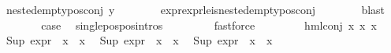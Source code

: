 \begin{isabellebody}
\ {\isachardoublequoteopen}nested{\isacharunderscore}{\kern0pt}empty{\isacharunderscore}{\kern0pt}pos{\isacharunderscore}{\kern0pt}conj\ y{\isachardoublequoteclose}\isanewline
\ \ \ \ \ \ \isamarkupfalse%
\ expr{\isacharunderscore}{\kern0pt}{}{\isacharunderscore}{\kern0pt}expr{\isacharunderscore}{\kern0pt}{}{\isacharunderscore}{\kern0pt}le{\isacharunderscore}{\kern0pt}{}{\isacharunderscore}{\kern0pt}is{\isacharunderscore}{\kern0pt}nested{\isacharunderscore}{\kern0pt}empty{\isacharunderscore}{\kern0pt}pos{\isacharunderscore}{\kern0pt}conj\isanewline
\ \ \ \ \ \ \isamarkupfalse%
\ blast\ \isanewline
\ \ \ \ \isamarkupfalse%
\ \isamarkupfalse%
\ {\isacharquery}{\kern0pt}case\ \isamarkupfalse%
\ single{\isacharunderscore}{\kern0pt}pos{\isacharunderscore}{\kern0pt}pos{\isachardot}{\kern0pt}intros{\isacharparenleft}{\kern0pt}{}{\isacharparenright}{\kern0pt}\ \isanewline
\ \ \ \ \ \ \isamarkupfalse%
\ fastforce\isanewline
\ \ \isamarkupfalse%
\isanewline
\ \ \ \ \isamarkupfalse%
\ {\isacharparenleft}{\kern0pt}hml{\isacharunderscore}{\kern0pt}conj\ x{}\ x{}\ x{}{\isacharparenright}{\kern0pt}\isanewline
{}\isamarkupfalse%
\ {\isachardoublequoteopen}{\isacharparenleft}{\kern0pt}Sup\ {\isacharparenleft}{\kern0pt}{\isacharparenleft}{\kern0pt}expr{\isacharunderscore}{\kern0pt}{}\ {\isasymcirc}\ x{}{\isacharparenright}{\kern0pt}\ {\isacharbackquote}{\kern0pt}\ x{}{\isacharparenright}{\kern0pt}\ {\isasymle}\ {}{\isacharparenright}{\kern0pt}{\isachardoublequoteclose}\isanewline
{\isachardoublequoteopen}{\isacharparenleft}{\kern0pt}Sup\ {\isacharparenleft}{\kern0pt}{\isacharparenleft}{\kern0pt}expr{\isacharunderscore}{\kern0pt}{}\ {\isasymcirc}\ x{}{\isacharparenright}{\kern0pt}\ {\isacharbackquote}{\kern0pt}\ x{}{\isacharparenright}{\kern0pt}\ {\isasymle}\ {}{\isacharparenright}{\kern0pt}{\isachardoublequoteclose}\isanewline
{\isachardoublequoteopen}{\isacharparenleft}{\kern0pt}Sup\ {\isacharparenleft}{\kern0pt}{\isacharparenleft}{\kern0pt}expr{\isacharunderscore}{\kern0pt}{}\ {\isasymcirc}\ x{}{\isacharparenright}{\kern0pt}\ {\isacharbackquote}{\kern0pt}\ x{}{\isacharparenright}{\kern0pt}\ {\isasymle}\ {}{\isacharparenright}{\kern0pt}{\isachardoublequoteclose}\isanewline
\ \ \ \ \ \ \isamarkupfalse%

\end{isabellebody}
